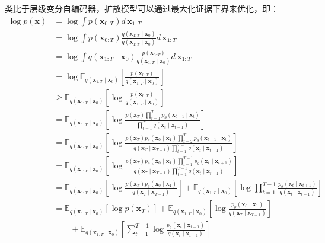 类比于层级变分自编码器，扩散模型可以通过最大化证据下界来优化，即：
\begin{align}
    \log p(\bm{x})
    &= \log \int p(\bm{x}_{0:T}) d\, \bm{x}_{1:T}
    \\ & = \log \int p(\bm{x}_{0:T}) \frac{q(\bm{x}_{1:T}\mid \bm{x}_{0})}{q(\bm{x}_{1:T}\mid \bm{x}_{0})} d\, \bm{x}_{1:T}
    \\ & = \log \int q(\bm{x}_{1:T}\mid \bm{x}_{0}) \frac{p(\bm{x}_{0:T}) }{q(\bm{x}_{1:T}\mid \bm{x}_{0})} d\, \bm{x}_{1:T}
    \\ & = \log \mathbb{E}_{q(\bm{x}_{1:T}\mid \bm{x}_{0})} \left[     \frac{p(\bm{x}_{0:T}) }{q(\bm{x}_{1:T}\mid \bm{x}_{0})}     \right]
    \\ & \geq  \mathbb{E}_{q(\bm{x}_{1:T}\mid \bm{x}_{0})} \left[   \log  \frac{p(\bm{x}_{0:T}) }{q(\bm{x}_{1:T}\mid \bm{x}_{0})}     \right] \label{eq:diffusion_elbo_origin}
    \\ & = \mathbb{E}_{q(\bm{x}_{1:T}\mid \bm{x}_{0})} \left[   \log  \frac{p(\bm{x}_{T}) \prod_{t=1}^{T}{p_{\theta}(\bm{x}_{t-1}\mid \bm{x}_{t})} }{\prod_{t=1}^{T}{q(\bm{x}_{t}\mid \bm{x}_{t-1})} }     \right]
    \\ & = \mathbb{E}_{q(\bm{x}_{1:T}\mid \bm{x}_{0})} \left[   \log  \frac{p(\bm{x}_{T})p_{\theta}(\bm{x}_{0} \mid \bm{x}_1) \prod_{t=2}^{T}{p_{\theta}(\bm{x}_{t-1}\mid \bm{x}_{t})} }{q(\bm{x}_{T}\mid \bm{x}_{T-1})\prod_{t=1}^{T-1}{q(\bm{x}_{t}\mid \bm{x}_{t-1})} }     \right]
    \\ & = \mathbb{E}_{q(\bm{x}_{1:T}\mid \bm{x}_{0})} \left[   \log  \frac{p(\bm{x}_{T})p_{\theta}(\bm{x}_{0} \mid \bm{x}_1) \prod_{t=1}^{T-1}{p_{\theta}(\bm{x}_{t}\mid \bm{x}_{t+1})} }{q(\bm{x}_{T}\mid \bm{x}_{T-1})\prod_{t=1}^{T-1}{q(\bm{x}_{t}\mid \bm{x}_{t-1})} }     \right]
    \\ & = \mathbb{E}_{q(\bm{x}_{1:T}\mid \bm{x}_{0})} \left[   \log  \frac{p(\bm{x}_{T})p_{\theta}(\bm{x}_{0} \mid \bm{x}_1)  }{q(\bm{x}_{T}\mid \bm{x}_{T-1})}     \right]
    + \mathbb{E}_{q(\bm{x}_{1:T}\mid \bm{x}_{0})} \left[   \log \prod_{t=1}^{T-1} {\frac{p_{\theta}(\bm{x}_{t}\mid \bm{x}_{t+1})} {q(\bm{x}_{t}\mid \bm{x}_{t-1})} }     \right]
    \\ & = \mathbb{E}_{q(\bm{x}_{1:T}\mid \bm{x}_{0})} \left[   \log  p(\bm{x}_{T})\right]
    + \mathbb{E}_{q(\bm{x}_{1:T}\mid \bm{x}_{0})} \left[   \log  \frac{p_{\theta}(\bm{x}_{0} \mid \bm{x}_1)  }{q(\bm{x}_{T}\mid \bm{x}_{T-1})}     \right]
    \nonumber \\ &\qquad+ \mathbb{E}_{q(\bm{x}_{1:T}\mid \bm{x}_{0})} \left[   \sum_{t=1}^{T-1} { \log \frac{p_{\theta}(\bm{x}_{t}\mid \bm{x}_{t+1})} {q(\bm{x}_{t}\mid \bm{x}_{t-1})} }     \right]

\end{align}
